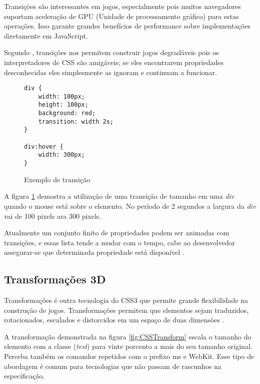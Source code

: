 Transições são interessantes em jogos, especialmente pois muitos
navegadores suportam aceleração de GPU (Unidade de processamento
gráfico) para estas operações. Isso garante grandes benefícios de
performance sobre implementações diretamente em JavaScript.

Segundo \citet{html5mostwanted}, transições nos permitem construir jogos
degradáveis pois os interpretadores de CSS são amigáveis; se eles
encontrarem propriedades desconhecidas eles simplesmente as ignoram e
continuam a funcionar.

\begin{figure}[H]
\centering
\begin{verbatim}
div {
    width: 100px;
    height: 100px;
    background: red;
    transition: width 2s;
}

div:hover {
    width: 300px;
}

\end{verbatim}
\caption{Exemplo de transição}
\label{fig:CSSTransition}
\end{figure}

A figura \ref{fig:CSSTransition} demostra a utilização de uma
transição de tamanho em uma \textit{div} quando o mouse está sobre o
elemento. No período de 2 segundos a largura da \textit{div} vai de 100
pixels ara 300 pixels.

Atualmente um conjunto finito de propriedades podem ser animadas
com transições, e essas lista tende a mudar com o tempo, cabe ao
desenvolvedor assegurar-se que determinada propriedade está disponível
\autocite{mdnTransitions}.

\subsection{Transformações 3D}

Transformações é outra tecnologia do CSS3 que permite grande
flexibilidade na construção de jogos. Transformações permitem que
elementos sejam traduzidos, rotacionados, escalados e distorcidos em um
espaço de duas dimensões \autocite{html5mostwanted}.

A transformação demonstrada na figura \ref{fig:CSSTransform} escala o
tamanho do elemento com a classe (\textit{test}) para vinte porcento a
mais do seu tamanho original. Perceba também os comandos repetidos com
o prefixo ms e WebKit. Esse tipo de abordagem é comum para tecnologias
que não passam de rascunhos na especificação.

